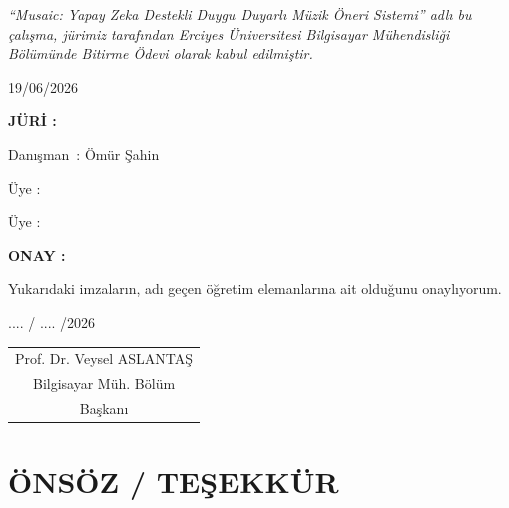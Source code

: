 \documentclass[12pt, a4paper]{report}
\begin{document}
\newpage
\thispagestyle{plain}
{}
\begin{center}
  \vspace*{1cm}
  \textit{``Musaic: Yapay Zeka Destekli Duygu Duyarlı Müzik Öneri Sistemi'' adlı bu çalışma, jürimiz tarafından Erciyes Üniversitesi Bilgisayar Mühendisliği Bölümünde Bitirme Ödevi olarak kabul edilmiştir.}

  \vspace{1.5cm}
  \hspace*{4cm}19/06/2026

  \vspace{1.5cm}
  \begin{flushleft}
    \textbf{JÜRİ :}

    \vspace{0.8cm}
    Danışman~: Ömür Şahin \hfill \underline{\hspace{5cm}}

    \vspace{0.8cm}
    Üye \hspace{1.1cm}: \hfill \underline{\hspace{5cm}}

    \vspace{0.8cm}
    Üye \hspace{1.1cm}: \hfill \underline{\hspace{5cm}}
  \end{flushleft}

  \vspace{2cm}
  \textbf{ONAY :}

  \vspace{0.5cm}
  Yukarıdaki imzaların, adı geçen öğretim elemanlarına ait olduğunu onaylıyorum.

  \vspace{3cm}
  \hfill .... / .... /2026

  \vspace{1cm}
  \hfill\begin{tabular}{c}
    Prof. Dr. Veysel ASLANTAŞ \\
    Bilgisayar Müh. Bölüm \\
    Başkanı
  \end{tabular}
\end{center}

\newpage
{}
{}
\chapter*{ÖNSÖZ / TEŞEKKÜR}
\end{document}
